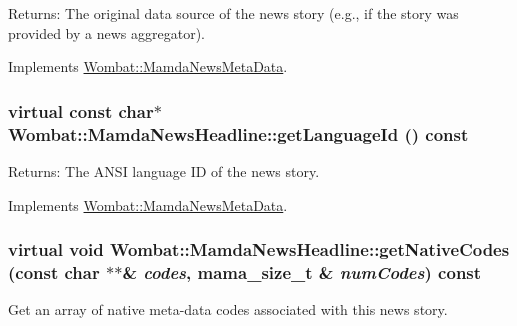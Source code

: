 \begin{Desc}
\item[Returns:]The original data source of the news story (e.g., if the story was provided by a news aggregator). \end{Desc}


Implements \hyperlink{classWombat_1_1MamdaNewsMetaData_5fe17063b6df522e76b7016884f964d1}{Wombat::Mamda\-News\-Meta\-Data}.\hypertarget{classWombat_1_1MamdaNewsHeadline_9142e41e5db9786622ffcd517b68d3b9}{
\subsubsection[getLanguageId]{\setlength{\rightskip}{0pt plus 5cm}virtual const char$\ast$ Wombat::Mamda\-News\-Headline::get\-Language\-Id () const}}
\label{classWombat_1_1MamdaNewsHeadline_9142e41e5db9786622ffcd517b68d3b9}


\begin{Desc}
\item[Returns:]The ANSI language ID of the news story. \end{Desc}


Implements \hyperlink{classWombat_1_1MamdaNewsMetaData_213a4b9676abf7cf91a311a599edc2d3}{Wombat::Mamda\-News\-Meta\-Data}.\hypertarget{classWombat_1_1MamdaNewsHeadline_49a407e757b36783514598581d4ce941}{
\subsubsection[getNativeCodes]{\setlength{\rightskip}{0pt plus 5cm}virtual void Wombat::Mamda\-News\-Headline::get\-Native\-Codes (const char $\ast$$\ast$\& {\em codes}, mama\_\-size\_\-t \& {\em num\-Codes}) const}}
\label{classWombat_1_1MamdaNewsHeadline_49a407e757b36783514598581d4ce941}


Get an array of native meta-data codes associated with this news story. 



